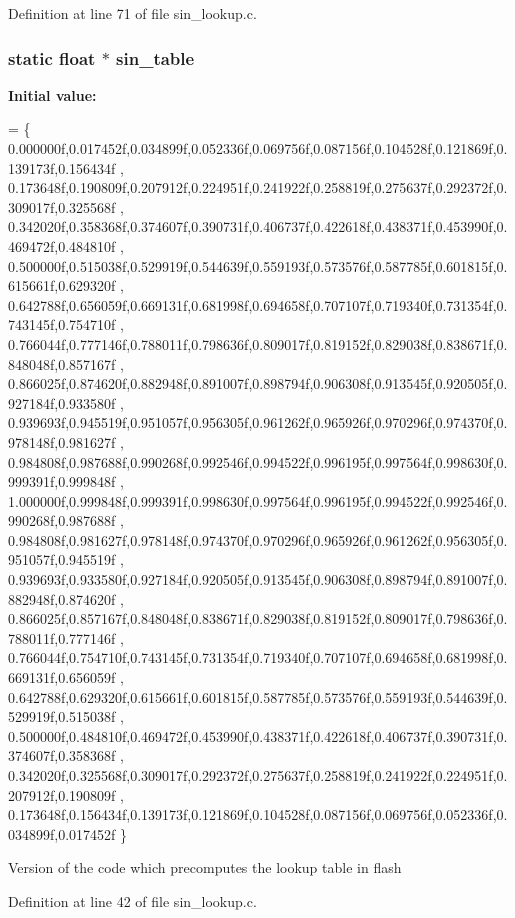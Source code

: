Definition at line 71 of file sin\-\_\-lookup.\-c.

\hypertarget{group___sine_ga70cc8b18ae100423fdb14030bc26eeb5}{
\subsubsection[{sin\-\_\-table}]{\setlength{\rightskip}{0pt plus 5cm}static float $\ast$ sin\-\_\-table}}\label{group___sine_ga70cc8b18ae100423fdb14030bc26eeb5}
{\bfseries Initial value\-:}
\begin{DoxyCode}
= \{
        0.000000f,0.017452f,0.034899f,0.052336f,0.069756f,0.087156f,0.104528f,0.121869f,0.139173f,0.156434f
      ,
        0.173648f,0.190809f,0.207912f,0.224951f,0.241922f,0.258819f,0.275637f,0.292372f,0.309017f,0.325568f
      ,
        0.342020f,0.358368f,0.374607f,0.390731f,0.406737f,0.422618f,0.438371f,0.453990f,0.469472f,0.484810f
      ,
        0.500000f,0.515038f,0.529919f,0.544639f,0.559193f,0.573576f,0.587785f,0.601815f,0.615661f,0.629320f
      ,
        0.642788f,0.656059f,0.669131f,0.681998f,0.694658f,0.707107f,0.719340f,0.731354f,0.743145f,0.754710f
      ,
        0.766044f,0.777146f,0.788011f,0.798636f,0.809017f,0.819152f,0.829038f,0.838671f,0.848048f,0.857167f
      ,
        0.866025f,0.874620f,0.882948f,0.891007f,0.898794f,0.906308f,0.913545f,0.920505f,0.927184f,0.933580f
      ,
        0.939693f,0.945519f,0.951057f,0.956305f,0.961262f,0.965926f,0.970296f,0.974370f,0.978148f,0.981627f
      ,
        0.984808f,0.987688f,0.990268f,0.992546f,0.994522f,0.996195f,0.997564f,0.998630f,0.999391f,0.999848f
      ,
        1.000000f,0.999848f,0.999391f,0.998630f,0.997564f,0.996195f,0.994522f,0.992546f,0.990268f,0.987688f
      ,
        0.984808f,0.981627f,0.978148f,0.974370f,0.970296f,0.965926f,0.961262f,0.956305f,0.951057f,0.945519f
      ,
        0.939693f,0.933580f,0.927184f,0.920505f,0.913545f,0.906308f,0.898794f,0.891007f,0.882948f,0.874620f
      ,
        0.866025f,0.857167f,0.848048f,0.838671f,0.829038f,0.819152f,0.809017f,0.798636f,0.788011f,0.777146f
      ,
        0.766044f,0.754710f,0.743145f,0.731354f,0.719340f,0.707107f,0.694658f,0.681998f,0.669131f,0.656059f
      ,
        0.642788f,0.629320f,0.615661f,0.601815f,0.587785f,0.573576f,0.559193f,0.544639f,0.529919f,0.515038f
      ,
        0.500000f,0.484810f,0.469472f,0.453990f,0.438371f,0.422618f,0.406737f,0.390731f,0.374607f,0.358368f
      ,
        0.342020f,0.325568f,0.309017f,0.292372f,0.275637f,0.258819f,0.241922f,0.224951f,0.207912f,0.190809f
      ,
        0.173648f,0.156434f,0.139173f,0.121869f,0.104528f,0.087156f,0.069756f,0.052336f,0.034899f,0.017452f
 \}
\end{DoxyCode}
Version of the code which precomputes the lookup table in flash 

Definition at line 42 of file sin\-\_\-lookup.\-c.

